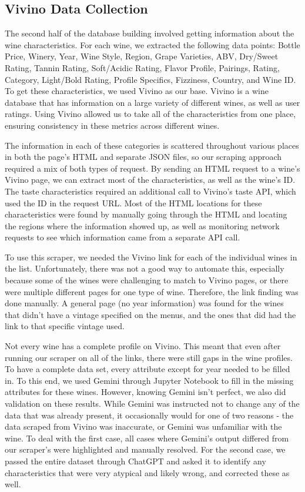 \documentclass{article} %
\begin{document}
\subsection{Vivino Data Collection}

The second half of the database building involved getting information about the wine characteristics. For each wine, we extracted the following data points: Bottle Price, Winery, Year, Wine Style, Region, Grape Varieties,	ABV,	Dry/Sweet	 Rating, Tannin Rating, Soft/Acidic Rating, Flavor Profile, Pairings, Rating,	 Category, Light/Bold	 Rating, Profile Specifics, Fizziness, Country, and Wine ID. To get these characteristics, we used Vivino as our base. Vivino is a wine database that has information on a large variety of different wines, as well as user ratings. Using Vivino allowed us to take all of the characteristics from one place, ensuring consistency in these metrics across different wines. 

The information in each of these categories is scattered throughout various places in both the page's HTML and separate JSON files, so our scraping approach required a mix of both types of request. By sending an HTML request to a wine's Vivino page, we can extract most of the characteristics, as well as the wine's ID. The taste characteristics required an additional call to Vivino's taste API, which used the ID in the request URL. Most of the HTML locations for these characteristics were found by manually going through the HTML and locating the regions where the information showed up, as well as monitoring network requests to see which information came from a separate API call.

To use this scraper, we needed the Vivino link for each of the individual wines in the list. Unfortunately, there was not a good way to automate this, especially because some of the wines were challenging to match to Vivino pages, or there were multiple different pages for one type of wine. Therefore, the link finding was done manually. A general page (no year information) was found for the wines that didn't have a vintage specified on the menus, and the ones that did had the link to that specific vintage used.

Not every wine has a complete profile on Vivino. This meant that even after running our scraper on all of the links, there were still gaps in the wine profiles. To have a complete data set, every attribute except for year needed to be filled in. To this end, we used Gemini through Jupyter Notebook to fill in the missing attributes for these wines. However, knowing Gemini isn't perfect, we also did validation on these results. While Gemini was instructed not to change any of the data that was already present, it occasionally would for one of two reasons - the data scraped from Vivino was inaccurate, or Gemini was unfamiliar with the wine. To deal with the first case, all cases where Gemini's output differed from our scraper's were highlighted and manually resolved. For the second case, we passed the entire dataset through ChatGPT and asked it to identify any characteristics that were very atypical and likely wrong, and corrected these as well.
\end{document}
